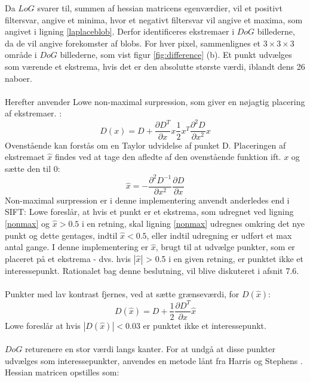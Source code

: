 Da $LoG$ svarer til, summen af hessian matricens egenværdier, vil et positivt filtersvar, angive et minima, hvor et negativt filtersvar vil angive et maxima, som angivet i ligning \eqref{laplaceblob}. Derfor identificeres ekstremaer i $DoG$ billederne, da de vil angive forekomster af blobs. For hver pixel, sammenlignes et $3\times3\times3$ område i $DoG$ billederne, som vist figur \ref{fig:difference} (b). Et punkt udvælges som værende et ekstrema, hvis det er den absolutte største værdi, iblandt dens 26 naboer.
\\
\\
Herefter anvender Lowe non-maximal surpression, som giver en nøjagtig placering af ekstremaer. \cite{nonmaximalsuppression}:
\begin{equation}
D(x)=D+\dfrac{\partial D^T}{\partial x}x\dfrac{1}{2}x^T\dfrac{\partial^2D}{\partial x^2}x
\label{nonmax}
\end{equation}
Ovenstående kan forstås om en Taylor udvidelse af punket D.
Placeringen af ekstremaet $\hat{x}$ findes ved at tage den afledte af den ovenstående funktion ift. $x$ og sætte den til 0:
\begin{equation}
\hat{x}= -\dfrac{\partial^2 D^{-1}}{\partial x^2}\dfrac{\partial D}{\partial x}
\label{xhat}
\end{equation}
Non-maximal surpression er i denne implementering anvendt anderledes end i SIFT: Lowe foreslår, at hvis et punkt er et ekstrema, som udregnet ved ligning \eqref{nonmax} og $\hat{x} > 0.5$ i en retning, skal ligning \eqref{nonmax} udregnes omkring det nye punkt og dette gentages, indtil $\hat{x} < 0.5$, eller indtil udregning er udført et max antal gange. I denne implementering er $\hat{x}$, brugt til at udvælge punkter, som er placeret på et ekstrema - dvs. hvis $|\hat{x}|$ > 0.5 i en given retning, er punktet ikke et interessepunkt.  Rationalet bag denne beslutning, vil blive diskuteret i afsnit 7.6.
\\
\\
Punkter med lav kontrast fjernes, ved at sætte grænseværdi, for $D(\hat{x})$:
\begin{equation}
D(\hat{x})=D+\dfrac{1}{2}\dfrac{\partial D^T}{\partial x}\hat{x}
\label{dxhat}
\end{equation}
Lowe foreslår at hvis $|D(\hat{x})|<0.03$ er punktet ikke et interessepunkt. \\ \\
$DoG$ returenere en stor værdi langs kanter. For at undgå at disse punkter udvælges som interessepunkter, anvendes en metode lånt fra Harris og Stephens \cite{harris}. Hessian matricen opstilles som:
